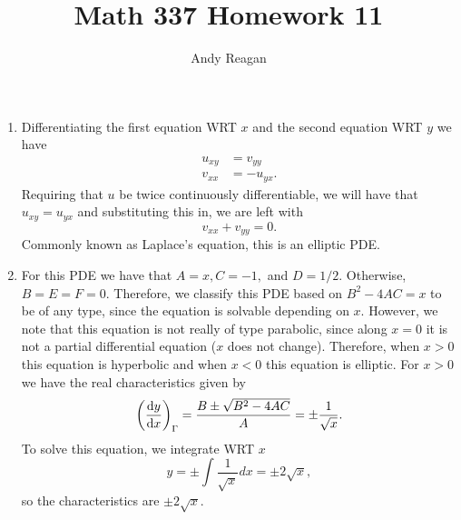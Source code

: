 \documentclass[11pt]{article}
\author{Andy Reagan}
\title{Math 337 Homework 11}
\def\f{\frac }
\newcommand{\diff}[2]{\frac{{\rm d}#1}{{\rm d}#2}}
\begin{document}
\maketitle

\begin{enumerate}

\item Differentiating the first equation WRT $x$ and the second equation WRT $y$ we have
\begin{align*} u_{xy} &= v_{yy}\\
v_{xx} &= -u_{yx}.\end{align*}
Requiring that $u$ be twice continuously differentiable, we will have that $u_{xy} = u_{yx}$ and substituting this in, we are left with
\[ v_{xx} + v_{yy} = 0 .\]
Commonly known as Laplace's equation, this is an elliptic PDE.

\item For this PDE we have that $A=x,C=-1,$ and $D=1/2$. Otherwise, $B=E=F=0$.
Therefore, we classify this PDE based on $B^2-4AC = x$ to be of any type, since the equation is solvable depending on $x$.
However, we note that this equation is not really of type parabolic, since along $x=0$ it is not a partial differential equation ($x$ does not change).
Therefore, when $x>0$ this equation is hyperbolic and when $x<0$ this equation is elliptic.
For $x>0$ we have the real characteristics given by
\[ \left ( \diff{y}{x} \right ) _{\Gamma} = \f{B\pm \sqrt{B^2-4AC}}{A} = \pm \f{1}{\sqrt{x}} .\]
To solve this equation, we integrate WRT $x$
\[ y = \pm \int \f{1}{\sqrt{x}} dx = \pm 2\sqrt{x} ,\]
so the characteristics are $\pm 2\sqrt{x}$.
\end{enumerate}
\end{document}
